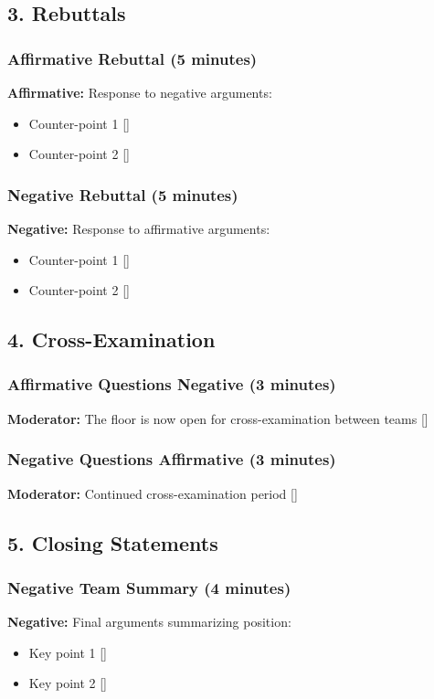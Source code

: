 \documentclass[12pt]{article}
\newcommand{\moderator}[1]{{\color{modcolor}\textbf{Moderator:} #1}}
\newcommand{\affirmative}[1]{{\color{affirmcolor}\textbf{Affirmative:} #1}}
\newcommand{\negative}[1]{{\color{negcolor}\textbf{Negative:} #1}}
\newcommand{\timestamp}{{\color{gray}\scriptsize[\currenttime]}}
\begin{document}
\subsection*{3. Rebuttals}

\subsubsection*{Affirmative Rebuttal (5 minutes)}
\affirmative{Response to negative arguments:
\begin{itemize}
    \item Counter-point 1 \timestamp
    \item Counter-point 2 \timestamp
\end{itemize}}

\subsubsection*{Negative Rebuttal (5 minutes)}
\negative{Response to affirmative arguments:
\begin{itemize}
    \item Counter-point 1 \timestamp
    \item Counter-point 2 \timestamp
\end{itemize}}

\subsection*{4. Cross-Examination}

\subsubsection*{Affirmative Questions Negative (3 minutes)}
\moderator{The floor is now open for cross-examination between teams \timestamp}

\subsubsection*{Negative Questions Affirmative (3 minutes)}
\moderator{Continued cross-examination period \timestamp}

\subsection*{5. Closing Statements}

\subsubsection*{Negative Team Summary (4 minutes)}
\negative{Final arguments summarizing position:
\begin{itemize}
    \item Key point 1 \timestamp
    \item Key point 2 \timestamp
\end{itemize}}
\end{document}

